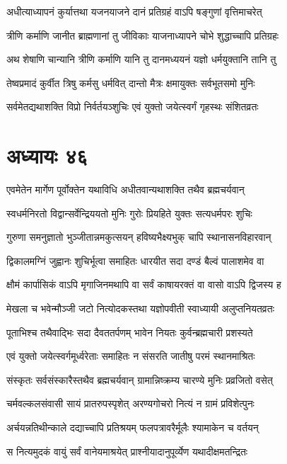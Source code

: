 \twolineshloka
{अधीत्याध्यापनं कुर्यात्तथा यजनयाजने}
{दानं प्रतिग्रहं वाऽपि षङ्गुणां वृत्तिमाचरेत्}


\twolineshloka
{त्रीणि कर्माणि जानीत ब्राह्मणानां तु जीविकाः}
{याजनाध्यापने चोभे शुद्धाच्चापि प्रतिग्रहः}


\twolineshloka
{अथ शेषाणि चान्यानि त्रीणि कर्माणि यानि तु}
{दानमध्ययनं यज्ञो धर्मयुक्तानि तानि तु}


\twolineshloka
{तेष्वप्रमादं कुर्वीत त्रिषु कर्मसु धर्मवित्}
{दान्तो मैत्रः क्षमायुक्तः सर्वभूतसमो मुनिः}


\twolineshloka
{सर्वमेतद्यथाशक्ति विप्रो निर्वर्तयञ्शुचिः}
{एवं युक्तो जयेत्स्वर्गं गृहस्थः संशितव्रतः}


\chapter{अध्यायः ४६}
\twolineshloka
{एवमेतेन मार्गेण पूर्वोक्तेन यथाविधि}
{अधीतवान्यथाशक्ति तथैव ब्रह्मचर्यवान्}


\twolineshloka
{स्वधर्मनिरतो विद्वान्सर्वेन्द्रिययतो मुनिः}
{गुरोः प्रियहिते युक्तः सत्यधर्मपरः शुचिः}


\twolineshloka
{गुरुणा समनुज्ञातो भुञ्जीतान्नमकुत्सयन्}
{हविष्यभैक्ष्यभुक् चापि स्थानासनविहारवान्}


\twolineshloka
{द्विकालमग्निं जुह्वानः शुचिर्भूत्वा समाहितः}
{धारयीत सदा दण्डं बैल्वं पालाशमेव वा}


\twolineshloka
{क्षौमं कार्पासिकं वाऽपि मृगाजिनमथापि वा}
{सर्वं काषायरक्तं वा वासो वाऽपि द्विजस्य ह}


\twolineshloka
{मेखला च भवेन्मौञ्जी जटो नित्योदकस्तथा}
{यज्ञोपवीती स्वाध्यायी अलुप्तनियतव्रतः}


\twolineshloka
{पूताभिश्च तथैवाद्भिः सदा दैवततर्पणम्}
{भावेन नियतः कुर्वन्ब्रह्मचारी प्रशस्यते}


\twolineshloka
{एवं युक्तो जयेत्स्वर्गमूर्ध्वरेताः समाहितः}
{न संसरति जातीषु परमं स्थानमाश्रितः}


\twolineshloka
{संस्कृतः सर्वसंस्कारैस्तथैव ब्रह्मचर्यवान्}
{ग्रामान्निष्क्रम्य चारण्ये मुनिः प्रव्रजितो वसेत्}


\twolineshloka
{चर्मवल्कलसंवासी सायं प्रातरुपस्पृशेत्}
{अरण्यगोचरो नित्यं न ग्रामं प्रविशेत्पुनः}


\twolineshloka
{अर्चयन्नतिथीन्काले दद्याच्चापि प्रतिश्रयम्}
{फलपत्रावरैर्मूलैः श्यामाकेन च वर्तयन्}


\twolineshloka
{स नित्यमुदकं वायुं सर्वं वानेयमाश्रयेत्}
{प्राश्नीयादानुपूर्व्येण यथादीक्षमतन्द्रितः}


